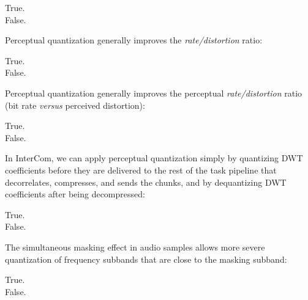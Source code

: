 \documentclass[legalpaper, 12pt, addpoints]{exam}
\begin{document}
\begin{questions}
\begin{oneparchoices}
  \choice True.\\
  \choice False.
\end{oneparchoices}
  
\vspace{0.10in}

\question Perceptual quantization generally improves the \emph{rate/distortion} ratio:

\begin{oneparchoices}
  \choice True.\\
  \choice False.
\end{oneparchoices}
  
\vspace{0.10in}

\question Perceptual quantization generally improves the perceptual \emph{rate/distortion} ratio (bit rate \emph{versus} perceived distortion):

\begin{oneparchoices}
  \choice True.\\
  \choice False.
\end{oneparchoices}

\vspace{0.10in}

\question In InterCom, we can apply perceptual quantization simply by quantizing DWT coefficients before they are delivered to the rest of the task pipeline that decorrelates, compresses, and sends the chunks, and by dequantizing DWT coefficients after being decompressed:

\begin{oneparchoices}
  \choice True.\\
  \choice False.
\end{oneparchoices}

\vspace{0.10in}

\question The simultaneous masking effect in audio samples allows more severe quantization of frequency subbands that are close to the masking subband:

\begin{oneparchoices}
  \choice True.\\
  \choice False.
\end{oneparchoices}

\vspace{0.10in}

\vspace{0.25in} {}

\end{questions}
\end{document}
